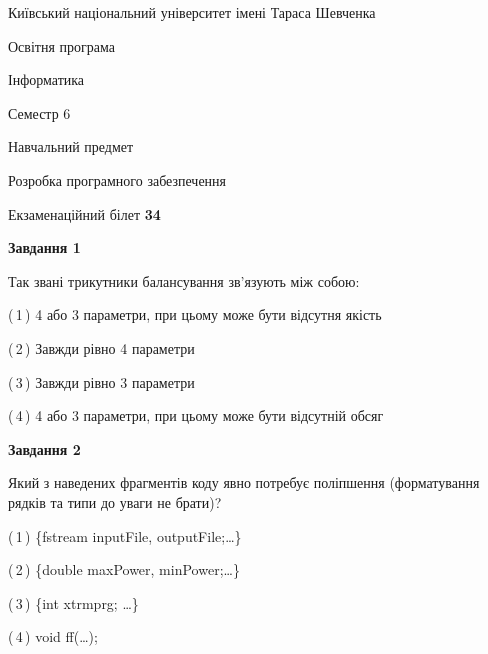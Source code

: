 \documentclass[10pt, ukrainian]{article}
\begin{document}
{{\begin {small}\par
{ \center  Київський національний університет імені Тараса Шевченка \par}
{\parbox {5 cm}{Освітня програма \hfill}{\parbox {7 cm}{Інформатика \hfill}}\parbox {6 cm}{\hfill Семестр 6}}\par
{\parbox {5 cm} {Навчальний предмет \hfill}\parbox {7 cm}{Розробка програмного забезпечення \hfill}\parbox {6cm}{\hfill}\par}\vspace{-7pt} \end{small}}{\center Екзаменаційний білет \No \textbf
{ 34 }\par}}
{
\begin {large}
{\begin {center}\textbf{Завдання 1}\end {center}}\par
Так звані трикутники балансування зв'язують між собою:\par
\vspace{2mm}



(\,1\,) 4 або 3 параметри, при цьому може бути відсутня якість%



(\,2\,) Завжди рівно 4 параметри%



(\,3\,) Завжди рівно 3 параметри%



(\,4\,) 4 або 3 параметри, при цьому може бути відсутній обсяг %


{\begin {center}\textbf{Завдання 2}\end {center}}\par
Який з наведених фрагментів коду явно потребує поліпшення (форматування рядків та типи до уваги не брати)?\par
\vspace{2mm}



(\,1\,) \{fstream inputFile, outputFile;…\} %



(\,2\,) \{double maxPower, minPower;…\} %



(\,3\,) \{int xtrmprg; …\}%



(\,4\,) void ff(…);%



\end{large}}
\end{document}
